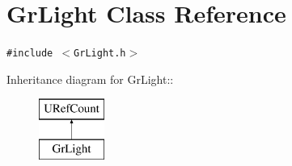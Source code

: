 \hypertarget{class_gr_light}{
\section{GrLight Class Reference}
\label{class_gr_light}
}
{\tt \#include $<$GrLight.h$>$}

Inheritance diagram for GrLight::\begin{figure}[H]
\begin{center}
\leavevmode
\includegraphics[height=2cm]{class_gr_light}
\end{center}
\end{figure}
